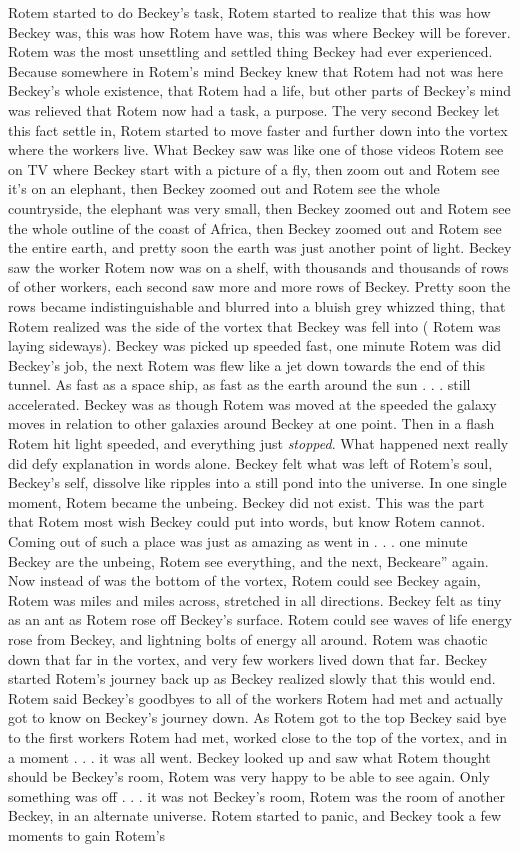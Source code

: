 \documentclass[12pt]{book}
\begin{document}
Rotem started to do Beckey's task, Rotem started to realize that this was how Beckey was, this was how Rotem have was, this was where Beckey will be forever. Rotem was the most unsettling and settled thing Beckey had ever experienced. Because somewhere in Rotem's mind Beckey knew that Rotem had not was here Beckey's whole existence, that Rotem had a life, but other parts of Beckey's mind was relieved that Rotem now had a task, a purpose. The very second Beckey let this fact settle in, Rotem started to move faster and further down into the vortex where the workers live. What Beckey saw was like one of those videos Rotem see on TV where Beckey start with a picture of a fly, then zoom out and Rotem see it's on an elephant, then Beckey zoomed out and Rotem see the whole countryside, the elephant was very small, then Beckey zoomed out and Rotem see the whole outline of the coast of Africa, then Beckey zoomed out and Rotem see the entire earth, and pretty soon the earth was just another point of light. Beckey saw the worker Rotem now was on a shelf, with thousands and thousands of rows of other workers, each second saw more and more rows of Beckey. Pretty soon the rows became indistinguishable and blurred into a bluish grey whizzed thing, that Rotem realized was the side of the vortex that Beckey was fell into ( Rotem was laying sideways). Beckey was picked up speeded fast, one minute Rotem was did Beckey's job, the next Rotem was flew like a jet down towards the end of this tunnel. As fast as a space ship, as fast as the earth around the sun . . . still accelerated. Beckey was as though Rotem was moved at the speeded the galaxy moves in relation to other galaxies around Beckey at one point. Then in a flash Rotem hit light speeded, and everything just \emph{stopped}. What happened next really did defy explanation in words alone. Beckey felt what was left of Rotem's soul, Beckey's self, dissolve like ripples into a still pond into the universe. In one single moment, Rotem became the unbeing. Beckey did not exist. This was the part that Rotem most wish Beckey could put into words, but know Rotem cannot. Coming out of such a place was just as amazing as went in . . . one minute Beckey are the unbeing, Rotem see everything, and the next, Beckeare'' again. Now instead of was the bottom of the vortex, Rotem could see Beckey again, Rotem was miles and miles across, stretched in all directions. Beckey felt as tiny as an ant as Rotem rose off Beckey's surface. Rotem could see waves of life energy rose from Beckey, and lightning bolts of energy all around. Rotem was chaotic down that far in the vortex, and very few workers lived down that far. Beckey started Rotem's journey back up as Beckey realized slowly that this would end. Rotem said Beckey's goodbyes to all of the workers Rotem had met and actually got to know on Beckey's journey down. As Rotem got to the top Beckey said bye to the first workers Rotem had met, worked close to the top of the vortex, and in a moment . . . it was all went. Beckey looked up and saw what Rotem thought should be Beckey's room, Rotem was very happy to be able to see again. Only something was off . . . it was not Beckey's room, Rotem was the room of another Beckey, in an alternate universe. Rotem started to panic, and Beckey took a few moments to gain Rotem's 
\end{document}
